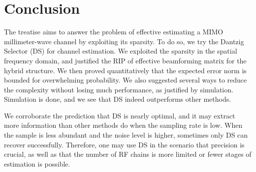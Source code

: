 
\chapter {Conclusion}

The treatise aims to answer the problem of effective estimating a MIMO millimeter-wave channel by exploiting its sparsity.
To do so, we try the Dantzig Selector (DS) for channel estimation.
We exploited the sparsity in the spatial frequency domain, and justified the RIP of effective beamforming matrix for the hybrid structure.
We then proved quantitatively that the expected error norm is bounded for overwhelming probability.
We also suggested several ways to reduce the complexity without losing much performance, as justified by simulation.
Simulation is done, and we see that DS indeed outperforms other methods.

We corroborate the prediction that DS is nearly optimal, and it may extract more information than other methods do when the sampling rate is low.
When the sample is less abundant and the noise level is higher, sometimes only DS can recover successfully.
Therefore, one may use DS in the scenario that precision is crucial, as well as that the number of RF chains is more limited or fewer stages of estimation is possible.


